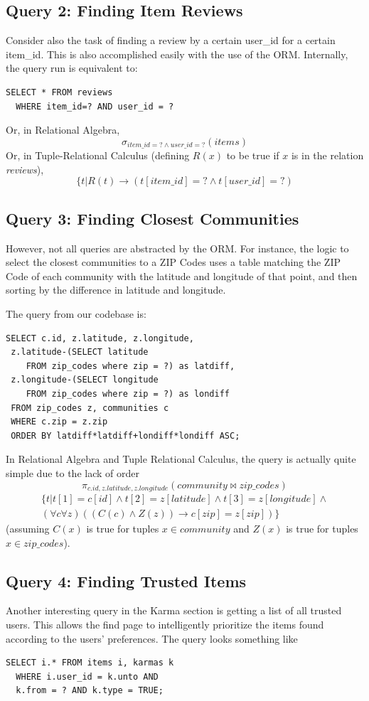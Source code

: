 \documentclass{acm_proc_article-sp}
\begin{document}
\subsection{Query 2: Finding Item Reviews}
Consider also the task of finding a review by a certain user\_id for a certain item\_id. This is also
accomplished easily with the use of the ORM. Internally, the query run is equivalent to:
\begin{lstlisting}
SELECT * FROM reviews 
  WHERE item_id=? AND user_id = ?
\end{lstlisting}
Or, in Relational Algebra,
\[ \sigma_{item\_id=? \land user\_id=?}(\textit{items}) \]
Or, in Tuple-Relational Calculus (defining $R(x)$ to be true if $x$ is in the relation \textit{reviews}),
\[ \{ t | R(t) \to (t[item\_id]=? \land t[user\_id]=?) \]

\subsection{Query 3: Finding Closest Communities}
However, not all queries are abstracted by the ORM. For instance, the logic to select the closest
communities to a ZIP Codes uses a table matching the ZIP Code of each community with the latitude and
longitude of that point, and then sorting by the difference in latitude and longitude.

The query from our codebase is:
\begin{lstlisting}
SELECT c.id, z.latitude, z.longitude, 
 z.latitude-(SELECT latitude 
    FROM zip_codes where zip = ?) as latdiff, 
 z.longitude-(SELECT longitude 
    FROM zip_codes where zip = ?) as londiff 
 FROM zip_codes z, communities c 
 WHERE c.zip = z.zip 
 ORDER BY latdiff*latdiff+londiff*londiff ASC;
\end{lstlisting}

In Relational Algebra and Tuple Relational Calculus, the query is actually quite simple due to the lack of order
\[ \pi_{c.id,z.latitude,z.longitude}(\textit{community}\bowtie\textit{zip\_codes}) \]
\[ 
\begin{split}\{ t | t[1] = c[id] \land t[2] = z[latitude] \land t[3] = z[longitude] \land \\
(\forall c\forall z)((C(c) \land Z(z)) \to c[zip] = z[zip])
\}
\end{split}
\]
(assuming $C(x)$ is true for tuples $x \in \textit{community}$ and $Z(x)$ is true for tuples $x \in \textit{zip\_codes}$).

\subsection{Query 4: Finding Trusted Items}
Another interesting query in the Karma section is getting a list of all trusted users. This allows the find page
to intelligently prioritize the items found according to the users' preferences. The query looks something like
\begin{lstlisting}
SELECT i.* FROM items i, karmas k 
  WHERE i.user_id = k.unto AND
  k.from = ? AND k.type = TRUE;
\end{lstlisting}
\end{document}
